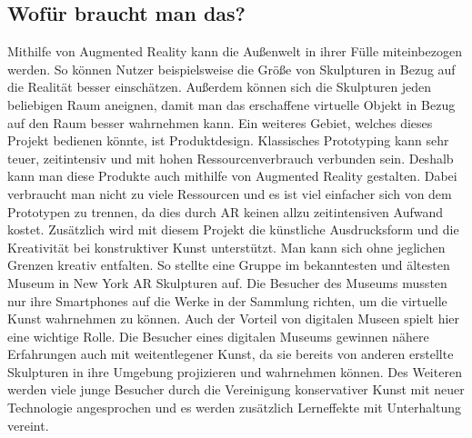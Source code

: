 \documentclass[12pt,a4paper, oneside]{scrartcl}
\begin{document}
	
	
	
\subsection{Wofür braucht man das?}	
	
Mithilfe von Augmented Reality kann die Außenwelt in ihrer Fülle miteinbezogen werden.
So können Nutzer beispielsweise die Größe von Skulpturen in Bezug auf die Realität besser einschätzen. Außerdem können sich die Skulpturen jeden beliebigen Raum aneignen, damit man das erschaffene virtuelle Objekt in Bezug auf den Raum besser wahrnehmen kann.
Ein weiteres Gebiet, welches dieses Projekt bedienen könnte, ist Produktdesign. Klassisches Prototyping kann sehr teuer, zeitintensiv und mit hohen Ressourcenverbrauch verbunden sein. Deshalb kann man diese Produkte auch mithilfe von Augmented Reality gestalten. Dabei verbraucht man nicht zu viele Ressourcen und es ist viel einfacher sich von dem Prototypen zu trennen, da dies durch AR keinen allzu zeitintensiven Aufwand kostet.
Zusätzlich wird mit diesem Projekt die künstliche Ausdrucksform und die Kreativität bei konstruktiver Kunst unterstützt. Man kann sich ohne jeglichen Grenzen kreativ entfalten. So stellte eine Gruppe im bekanntesten und ältesten Museum in New York AR Skulpturen auf. Die Besucher des Museums mussten nur ihre Smartphones auf die Werke in der Sammlung richten, um die virtuelle Kunst wahrnehmen zu können.
Auch der Vorteil von digitalen Museen spielt hier eine wichtige Rolle. Die Besucher eines digitalen Museums gewinnen nähere Erfahrungen auch mit weitentlegener Kunst, da sie bereits von anderen erstellte Skulpturen in ihre Umgebung projizieren und wahrnehmen können. Des Weiteren werden viele junge Besucher durch die Vereinigung konservativer Kunst mit neuer Technologie angesprochen und es werden zusätzlich Lerneffekte mit Unterhaltung vereint.






\newpage



\end{document}
